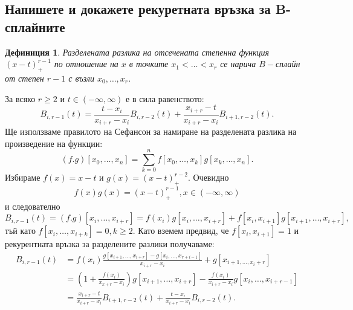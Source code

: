 \documentclass[12pt]{article}
\numberwithin{equation}{subsection}
\newtheorem{definition}{Дефиниция}
\numberwithin{theorem}{subsection}
\numberwithin{definition}{subsection}
\numberwithin{corollary}{subsection}
\begin{document}
\subsection{Напишете и докажете рекуретната връзка за B-сплайните}
  \begin{definition}
    Разделената разлика на отсечената степенна функция $(x-t)_+^{r-1}$ по отношение на $x$ в точките $x_1< \ldots< x_r$ се нарича $B-$сплайн от степен $r-1$ с възли $x_0,\ldots,x_r$.
  \end{definition}
  \theorem
  За всяко $r\geq2$ и $t\in(-\infty,\infty)$ е в сила равенството:
  \begin{equation}\label{bSplineRec}
    B_{i,r-1}(t)=\frac{t-x_i}{x_{i+r}-x_i}B_{i,r-2}(t)+\frac{x_{i+r}-t}{x_{i+r}-x_i}B_{i+1,r-2}(t).
  \end{equation}
  \proof
  Ще използваме правилото на Сефансон за намиране на разделената разлика на произведение на функции:
  \begin{equation*}
    (f.g)[x_0,\ldots,x_n]=\sum_{k=0}^{n}f[x_0,\ldots,x_k]g[x_k,\ldots,x_n].
  \end{equation*}
  Избираме $f(x)=x-t$ и $g(x)=(x-t)_+^{r-2}$. Очевидно
  \begin{equation*}
    f(x)g(x)=(x-t)_+^{r-1}, x\in(-\infty, \infty)
  \end{equation*}
  и следователно
  \begin{equation*}
    B_{i,r-1}(t)=(f.g)[x_i,\ldots,x_{i+r}]=f(x_i)g[x_i,\ldots,x_{i+r}]+f[x_i,x_{i+1}]g[x_{i+1}, \ldots,x_{i+r}],
  \end{equation*}
  тъй като $f[x_i,\ldots,x_{i+k}]=0, k\geq2$. Като вземем предвид, че $f[x_i,x_{i+1}]=1$ и рекурентната връзка за разделените разлики получаваме:
  \begin{align*}
    B_{i,r-1}(t)&=f(x_i)\frac{g[x_{i+1},\ldots, x_{i+r}]-g[x_i,\ldots,x_{r+i-1}]}{x_{i+r}-x_i}+g[x_{i+1,\ldots,x_i+r}]\\
    &=\left(1+\frac{f(x_i)}{x_{x+r}-x_i}\right)g[x_{i+1},\ldots,x_{i+r}]-\frac{f(x_i)}{x_{i+r}-x_i}g[x_i,\ldots,x_{i+r-1}]\\
    &=\frac{x_{i+r}-t}{x_{i+r}-x_i}B_{i+1,r-2}(t)+\frac{t-x_i}{x_{i+r}-x_i}B_{i,r-2}(t).
  \end{align*}
\end{document}
